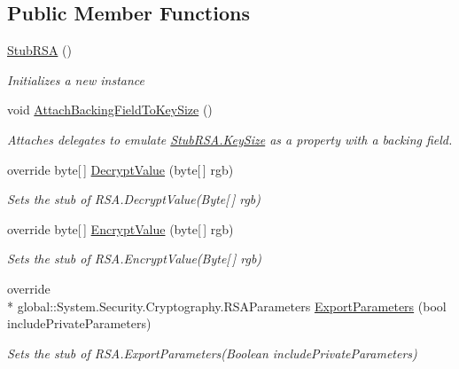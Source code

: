 \subsection*{Public Member Functions}
\begin{DoxyCompactItemize}
\item 
\hyperlink{class_system_1_1_security_1_1_cryptography_1_1_fakes_1_1_stub_r_s_a_a5271bd533f376eacfe9ecc009a937298}{Stub\-R\-S\-A} ()
\begin{DoxyCompactList}\small\item\em Initializes a new instance\end{DoxyCompactList}\item 
void \hyperlink{class_system_1_1_security_1_1_cryptography_1_1_fakes_1_1_stub_r_s_a_a1af2b5a89da80f78dca819682018b64e}{Attach\-Backing\-Field\-To\-Key\-Size} ()
\begin{DoxyCompactList}\small\item\em Attaches delegates to emulate \hyperlink{class_system_1_1_security_1_1_cryptography_1_1_fakes_1_1_stub_r_s_a_a97a9c8be9c62f44a596860ab8e60df06}{Stub\-R\-S\-A.\-Key\-Size} as a property with a backing field.\end{DoxyCompactList}\item 
override byte\mbox{[}$\,$\mbox{]} \hyperlink{class_system_1_1_security_1_1_cryptography_1_1_fakes_1_1_stub_r_s_a_a23e79ebae209eb3262c70a309d9bb0cf}{Decrypt\-Value} (byte\mbox{[}$\,$\mbox{]} rgb)
\begin{DoxyCompactList}\small\item\em Sets the stub of R\-S\-A.\-Decrypt\-Value(\-Byte\mbox{[}$\,$\mbox{]} rgb)\end{DoxyCompactList}\item 
override byte\mbox{[}$\,$\mbox{]} \hyperlink{class_system_1_1_security_1_1_cryptography_1_1_fakes_1_1_stub_r_s_a_af256893c3f77d4cbc4eb55e8120102b2}{Encrypt\-Value} (byte\mbox{[}$\,$\mbox{]} rgb)
\begin{DoxyCompactList}\small\item\em Sets the stub of R\-S\-A.\-Encrypt\-Value(\-Byte\mbox{[}$\,$\mbox{]} rgb)\end{DoxyCompactList}\item 
override \\*
global\-::\-System.\-Security.\-Cryptography.\-R\-S\-A\-Parameters \hyperlink{class_system_1_1_security_1_1_cryptography_1_1_fakes_1_1_stub_r_s_a_a5fb0ab1ee80f8a1e86d8299f2434922f}{Export\-Parameters} (bool include\-Private\-Parameters)
\begin{DoxyCompactList}\small\item\em Sets the stub of R\-S\-A.\-Export\-Parameters(\-Boolean include\-Private\-Parameters)\end{DoxyCompactList}\item 

\end{DoxyCompactItemize}
